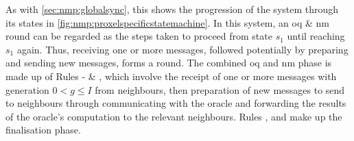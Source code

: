 As with \cref{sec:nmp:globalsync}, this  shows the progression of the system through its states in \cref{fig:nmp:proxelspecificstatemachine}.  In this system, an \gls{oq} \& \gls{nm} round can be regarded as the steps taken to proceed from state \(s_1\) until reaching \(s_1\) again.  Thus, receiving one or more messages, followed potentially by preparing and sending new messages, forms a round.  The combined \gls{oq} and \gls{nm} phase is made up of Rules - \& , which involve the receipt of one or more messages with generation \(0 < g \leq I\) from neighbours, then preparation of new messages to send to neighbours through communicating with the oracle and forwarding the results of the oracle's computation to the relevant neighbours.  Rules ,  and  make up the finalisation phase.

